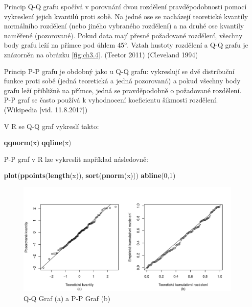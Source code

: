 \documentclass[12pt,]{article}
\newenvironment{Shaded}{\begin{snugshade}}{\end{snugshade}}
\newcommand{\KeywordTok}[1]{\textcolor[rgb]{0.13,0.29,0.53}{\textbf{#1}}}
\newcommand{\DecValTok}[1]{\textcolor[rgb]{0.00,0.00,0.81}{#1}}
\newcommand{\NormalTok}[1]{#1}
\begin{document}
\qquad Princip Q-Q grafu spočívá v porovnání dvou rozdělení
pravděpodobnosti pomocí vykreslení jejich kvantilů proti sobě. Na jedné
ose se nacházejí teoretické kvantily normálního rozdělení (nebo jiného
vybraného rozdělení) a na druhé ose kvantily naměřené (pozorované).
Pokud data mají přesně požadované rozdělení, všechny body grafu leží na
přímce pod úhlem 45°. Vztah hustoty rozdělení a Q-Q grafu je znázorněn
na obrázku \ref{fig:ch3.4}. (Teetor 2011) (Cleveland 1994)

\qquad Princip P-P grafu je obdobný jako u Q-Q grafu: vykreslují se dvě
distribuční funkce proti sobě (jedná teoretická a jedná pozorovaná) a
pokud všechny body grafu leží přibližně na přímce, jedná se
pravděpodobně o požadované rozdělení. P-P graf se často používá k
vyhodnocení koeficientu šikmosti rozdělení.(Wikipedia {[}vid.
11.8.2017{]})

V R se Q-Q graf vykreslí takto:

\begin{Shaded}
\begin{Highlighting}[]
\KeywordTok{qqnorm}\NormalTok{(x)}
\KeywordTok{qqline}\NormalTok{(x)}
\end{Highlighting}
\end{Shaded}

P-P graf v R lze vykreslit například následovně:

\begin{Shaded}
\begin{Highlighting}[]
\KeywordTok{plot}\NormalTok{(}\KeywordTok{ppoints}\NormalTok{(}\KeywordTok{length}\NormalTok{(x)), }\KeywordTok{sort}\NormalTok{(}\KeywordTok{pnorm}\NormalTok{(x)))}
\KeywordTok{abline}\NormalTok{(}\DecValTok{0}\NormalTok{,}\DecValTok{1}\NormalTok{)}
\end{Highlighting}
\end{Shaded}

\begin{figure}[H]

{\centering \includegraphics{BP_files/figure-latex/pp-qq plots-1} 

}

\caption{\label{fig:ch2.3} Q-Q Graf (a) a P-P Graf (b)}\label{fig:pp-qq plots}
\end{figure}
\end{document}
